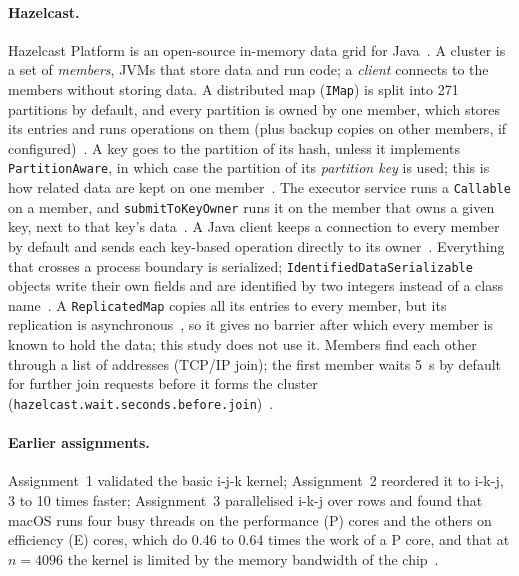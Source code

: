 \documentclass[11pt,a4paper]{article}
\begin{document}
\paragraph{Hazelcast.} Hazelcast Platform is an open-source in-memory data
grid for Java~\cite{hzrelease}. A cluster is a set of \emph{members}, JVMs that
store data and run code; a \emph{client} connects to the members without
storing data. A distributed map (\texttt{IMap}) is split into 271 partitions by
default, and every partition is owned by one member, which stores its entries
and runs operations on them (plus backup copies on other members, if
configured)~\cite{hzbackups}. A key goes to the partition of its hash, unless it
implements \texttt{PartitionAware}, in which case the partition of its
\emph{partition key} is used; this is how related data are kept on one
member~\cite{hzaffinity}. The executor service runs a \texttt{Callable} on a
member, and \texttt{submitToKeyOwner} runs it on the member that owns a given
key, next to that key's data~\cite{hzexecutor,hzaffinity}. A Java client keeps a
connection to every member by default and sends each key-based operation
directly to its owner~\cite{hzclient}. Everything that crosses a process
boundary is serialized; \texttt{IdentifiedDataSerializable} objects write their
own fields and are identified by two integers instead of a class
name~\cite{hzserialization}. A \texttt{ReplicatedMap} copies all its entries to
every member, but its replication is asynchronous~\cite{hzreplicated}, so it
gives no barrier after which every member is known to hold the data; this study
does not use it. Members find each other through a list of addresses (TCP/IP
join); the first member waits 5~s by default for further join requests before
it forms the cluster (\texttt{hazelcast.wait.seconds.before.join})~\cite{hzproperties}.

\paragraph{Earlier assignments.} Assignment~1 validated the basic i-j-k
kernel; Assignment~2 reordered it to i-k-j, 3 to 10 times faster; Assignment~3
parallelised i-k-j over rows and found that macOS runs four busy threads on
the performance (P) cores and the others on efficiency (E) cores, which do 0.46
to 0.64 times the work of a P core, and that at $n=4096$ the kernel is limited
by the memory bandwidth of the chip~\cite{a3report}.

\end{document}
